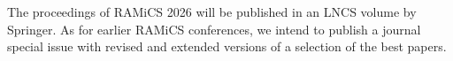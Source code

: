 \documentclass[a3paper, 12pt]{article}
\newcommand*\nfont{\fontsize{16}{19}\selectfont}
\begin{document}
\begin{minipage}[t]{.43\linewidth}
  \nfont%
  The proceedings of RAMiCS 2026 will be published in an LNCS volume
  by Springer.  As for earlier RAMiCS conferences, we intend to
  publish a journal special issue with revised and extended versions
  of a selection of the best papers.







  




  


\end{minipage}
\end{document}
